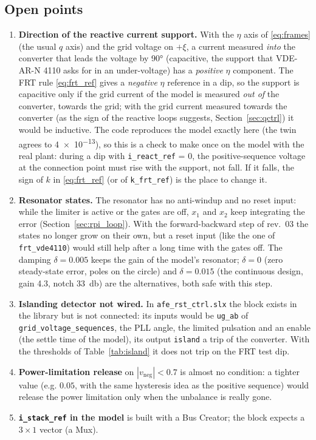 \documentclass[11pt,a4paper]{scrartcl}
\newcommand{\ped}[1]{_{\mathrm{#1}}}
\newcommand{\code}[1]{\texttt{#1}}
\begin{document}
\begin{onehalfspace}
\section{Open points}
\label{sec:open}

\begin{enumerate}[nosep]
	\item \textbf{Direction of the reactive current support.} With the $\eta$ axis of \eqref{eq:frames} (the usual $q$ axis) and the grid voltage on $+\xi$, a current measured \emph{into} the converter that leads the voltage by \ang{90} (capacitive, the support that VDE-AR-N 4110 asks for in an under-voltage) has a \emph{positive} $\eta$ component. The FRT rule \eqref{eq:frt_ref} gives a \emph{negative} $\eta$ reference in a dip, so the support is capacitive only if the grid current of the model is measured \emph{out of} the converter, towards the grid; with the grid current measured towards the converter (as the sign of the reactive loops suggests, Section~\ref{sec:qctrl}) it would be inductive. The code reproduces the model exactly here (the twin agrees to \num{4e-13}), so this is a check to make once on the model with the real plant: during a dip with \code{i\_react\_ref} = 0, the positive-sequence voltage at the connection point must rise with the support, not fall. If it falls, the sign of $k$ in \eqref{eq:frt_ref} (or of \code{k\_frt\_ref}) is the place to change it.
	\item \textbf{Resonator states.} The resonator has no anti-windup and no reset input: while the limiter is active or the gates are off, $x_1$ and $x_2$ keep integrating the error (Section~\ref{sec:rpi_loop}). With the forward-backward step of rev.~03 the states no longer grow on their own, but a reset input (like the one of \code{frt\_vde4110}) would still help after a long time with the gates off. The damping $\delta = 0.005$ keeps the gain of the model's resonator; $\delta = 0$ (zero steady-state error, poles on the circle) and $\delta = 0.015$ (the continuous design, gain 4.3, notch \SI{33}{\decibel}) are the alternatives, both safe with this step.
	\item \textbf{Islanding detector not wired.} In \code{afe\_rst\_ctrl.slx} the block exists in the library but is not connected: its inputs would be \code{ug\_ab} of \code{grid\_voltage\_sequences}, the PLL angle, the limited pulsation and an enable (the settle time of the model), its output \code{island} a trip of the converter. With the thresholds of Table~\ref{tab:island} it does not trip on the FRT test dip.
	\item \textbf{Power-limitation release} on $|v\ped{neg}| < 0.7$ is almost no condition: a tighter value (e.g. $0.05$, with the same hysteresis idea as the positive sequence) would release the power limitation only when the unbalance is really gone.
	\item \textbf{\code{i\_stack\_ref} in the model} is built with a Bus Creator; the block expects a $3 \times 1$ vector (a Mux).
\end{enumerate}


\end{onehalfspace}
\end{document}

